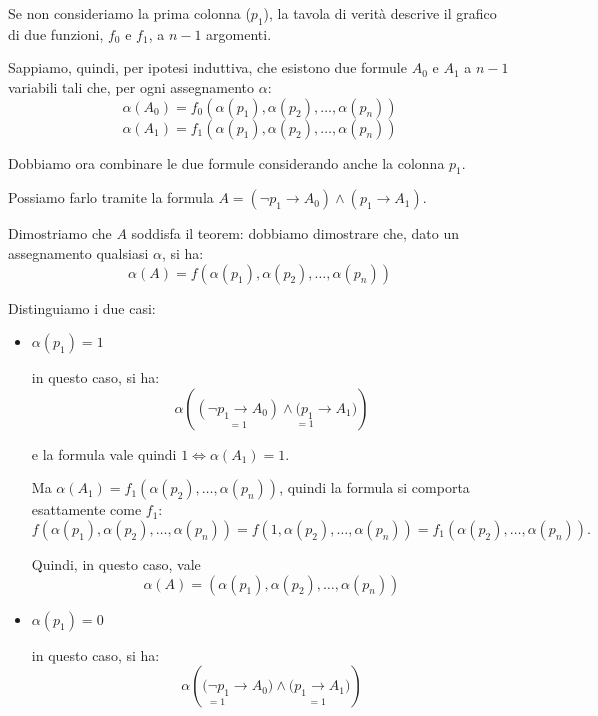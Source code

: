 \documentclass[a4paper,11pt]{report}
\begin{document}
\begin{proofframe}[title=dimostrazione]
\begin{itemize}
            Se non consideriamo la prima colonna (\( p_1 \)), la tavola di verità descrive il grafico di due funzioni, \( f_0 \) e \( f_1 \), a \( n-1 \) argomenti.

            Sappiamo, quindi, per ipotesi induttiva, che esistono due formule \( A_0 \) e \( A_1 \) a \( n-1 \) variabili tali che, per ogni assegnamento \( \alpha \):
            \[ \alpha(A_0) = f_0(\alpha(p_1), \alpha(p_2), \dots, \alpha(p_n)) \]
            \[ \alpha(A_1) = f_1(\alpha(p_1), \alpha(p_2), \dots, \alpha(p_n)) \]

            Dobbiamo ora combinare le due formule considerando anche la colonna \( p_1 \).

            Possiamo farlo tramite la formula \(A= (\neg p_1 \to A_0) \land (p_1 \to A_1) \).

            Dimostriamo che \( A \) soddisfa il teorem: dobbiamo dimostrare che, dato un assegnamento qualsiasi \( \alpha \), si ha:
    \[ \alpha(A) = f(\alpha(p_1), \alpha(p_2), \dots, \alpha(p_n)) \]

    Distinguiamo i due casi:
    \begin{itemize}
        \item \( \alpha(p_1) = 1 \) 

            in questo caso, si ha:
            \[
                \alpha\!\left(
                    \underset{=1}{(\neg p_1 \to A_0)}
                    \land
                \underset{=1}{(p_1} \to A_1)
                \right)
            \]

            e la formula vale quindi \( 1 \iff \alpha(A_1) = 1 \).

            Ma \( \alpha(A_1) = f_1(\alpha(p_2), \dots, \alpha(p_n)) \), quindi la formula si comporta esattamente come \( f_1 \):
            \[
                f(\alpha(p_1), \alpha(p_2), \ldots, \alpha(p_n))
                = f(1, \alpha(p_2), \ldots, \alpha(p_n))
                = f_1(\alpha(p_2), \ldots, \alpha(p_n)).
            \]

            Quindi, in questo caso, vale 
            \[\alpha(A) = (\alpha(p_1), \alpha(p_2), \ldots, \alpha(p_n))\]

        \item \( \alpha(p_1) = 0 \)            

            in questo caso, si ha:
            \[
                \alpha\!\left(
                    \underset{=1}{(\neg p_1} \to A_0)
                    \land
                    \underset{=1}{(p_1 \to A_1})
            \right)\]


\end{itemize}
\end{itemize}
\end{proofframe}
\end{document}
